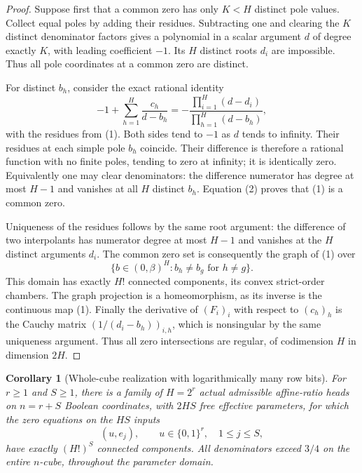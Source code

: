 \documentclass[11pt]{article}
\newtheorem{corollary}[theorem]{Corollary}
\begin{document}
\begin{proof}
Suppose first that a common zero has only $K<H$ distinct pole values.
Collect equal poles by adding their residues. Subtracting one and
clearing the $K$ distinct denominator factors gives a polynomial
in a scalar argument $d$ of degree exactly $K$, with leading
coefficient $-1$. Its $H$ distinct roots $d_i$ are impossible.
Thus all pole coordinates at a common zero are distinct.

For distinct $b_h$, consider the exact rational identity
\[
 -1+\sum_{h=1}^H\frac{c_h}{d-b_h}
 =-\frac{\prod_{i=1}^H(d-d_i)}{\prod_{h=1}^H(d-b_h)},
 \tag{2}
\]
with the residues from (1). Both sides tend to $-1$ as $d$ tends
to infinity. Their residues at each simple pole $b_h$ coincide.
Their difference is therefore a rational function with no finite
poles, tending to zero at infinity; it is identically zero.
Equivalently one may clear denominators: the difference numerator
has degree at most $H-1$ and vanishes at all $H$ distinct $b_h$.
Equation (2) proves that (1) is a common zero.

Uniqueness of the residues follows by the same root argument:
the difference of two interpolants has numerator degree at most
$H-1$ and vanishes at the $H$ distinct arguments $d_i$.
The common zero set is consequently the graph of (1) over
\[
 \{b\in(0,\beta)^H:b_h\ne b_g\text{ for }h\ne g\}.
\]
This domain has exactly $H!$ connected components, its convex
strict-order chambers. The graph projection is a homeomorphism,
as its inverse is the continuous map (1).
Finally the derivative of $(F_i)_i$ with respect to $(c_h)_h$
is the Cauchy matrix $(1/(d_i-b_h))_{i,h}$, which is nonsingular
by the same uniqueness argument. Thus all zero intersections
are regular, of codimension $H$ in dimension $2H$.
\end{proof}

\begin{corollary}[Whole-cube realization with logarithmically many row bits]
For $r\geq1$ and $S\geq1$, there is a family of $H=2^r$ actual
admissible affine-ratio heads on $n=r+S$ Boolean coordinates, with
$2HS$ free effective parameters, for which the zero equations on
the $HS$ inputs
\[
 (u,e_j),\qquad u\in\{0,1\}^r,\quad 1\leq j\leq S,
\]
have exactly $(H!)^S$ connected components. All denominators exceed
$3/4$ on the entire $n$-cube, throughout the parameter domain.
\end{corollary}
\end{document}
